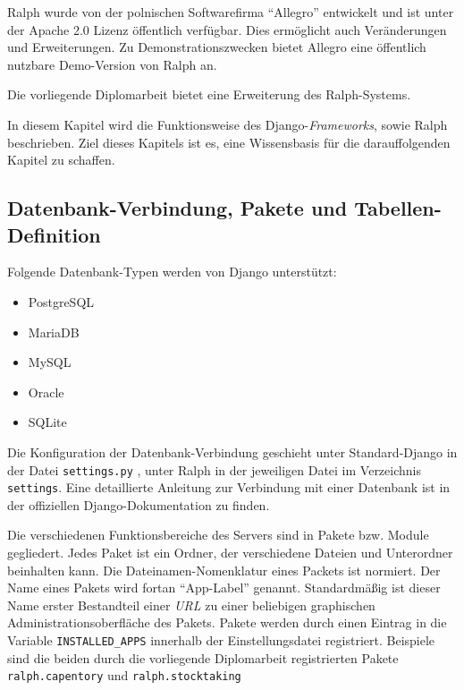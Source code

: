 Ralph wurde von der polnischen Softwarefirma ``Allegro'' entwickelt und
ist unter der Apache 2.0 Lizenz öffentlich verfügbar. Dies ermöglicht
auch Veränderungen und Erweiterungen. Zu Demonstrationszwecken bietet
Allegro eine öffentlich nutzbare Demo-Version \cite{ralph-demo} von
Ralph an.

Die vorliegende Diplomarbeit bietet eine Erweiterung des Ralph-Systems.

In diesem Kapitel wird die Funktionsweise des
Django-\emph{Frameworks},
sowie Ralph beschrieben. Ziel dieses Kapitels ist es, eine Wissensbasis
für die darauffolgenden Kapitel zu schaffen.

\hypertarget{datenbank-verbindung-pakete-und-tabellen-definition}{%
\subsection{Datenbank-Verbindung, Pakete und
Tabellen-Definition}\label{datenbank-verbindung-pakete-und-tabellen-definition}}

Folgende Datenbank-Typen werden von Django unterstützt:

\begin{itemize}
\tightlist
\item
  PostgreSQL
\item
  MariaDB
\item
  MySQL
\item
  Oracle
\item
  SQLite
\end{itemize}

Die Konfiguration der Datenbank-Verbindung geschieht unter
Standard-Django in der Datei \texttt{settings.py} , unter Ralph in der
jeweiligen Datei im Verzeichnis \texttt{settings}. Eine detaillierte
Anleitung zur Verbindung mit einer Datenbank ist in der offiziellen
Django-Dokumentation \cite{django-doku-db} zu finden.

Die verschiedenen Funktionsbereiche des Servers sind in Pakete bzw.
Module gegliedert. Jedes Paket ist ein Ordner, der verschiedene Dateien
und Unterordner beinhalten kann. Die Dateinamen-Nomenklatur eines
Packets ist normiert.\cite{django-file-nomenklatur} Der Name eines
Pakets wird fortan ``App-Label'' genannt. Standardmäßig ist dieser Name
erster Bestandteil einer \emph{URL}
 zu einer beliebigen
graphischen Administrationsoberfläche des Pakets. Pakete werden durch
einen Eintrag in die Variable \texttt{INSTALLED\_APPS} innerhalb der
\oa{} Einstellungsdatei registriert. Beispiele sind die beiden durch die
vorliegende Diplomarbeit registrierten Pakete \texttt{ralph.capentory}
und \texttt{ralph.stocktaking}

